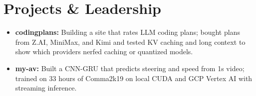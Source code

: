 \documentclass[11pt, letterpaper]{article}
\begin{document}
\section{Projects \& Leadership}
\begin{itemize}
  \item \textbf{codingplans:} Building a site that rates LLM coding plans; bought plans from Z.AI, MiniMax, and Kimi and tested KV caching and long context to show which providers nerfed caching or quantized models.
  \item \textbf{my-av:} Built a CNN-GRU that predicts steering and speed from 1s video; trained on 33 hours of Comma2k19 on local CUDA and GCP Vertex AI with streaming inference.
\end{itemize}
\end{document}

